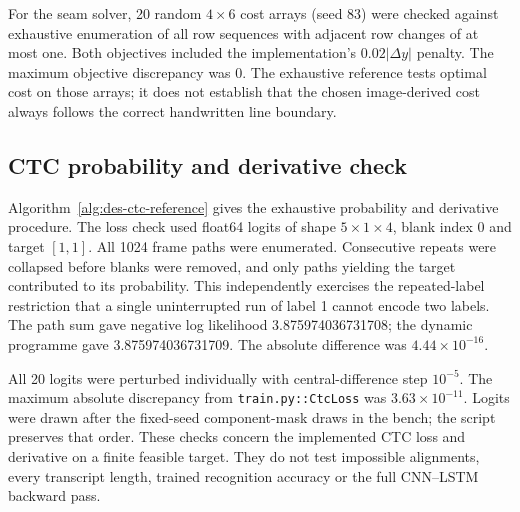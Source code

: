 For the seam solver, 20 random $4\times6$ cost arrays (seed 83) were checked against exhaustive enumeration of all row sequences with adjacent row changes of at most one. Both objectives included the implementation's $0.02|\Delta y|$ penalty. The maximum objective discrepancy was $0$. The exhaustive reference tests optimal cost on those arrays; it does not establish that the chosen image-derived cost always follows the correct handwritten line boundary.

\begin{designalgorithm}
\caption{Independent partition and seam verification}
\label{alg:des-reference-checks}
\begin{designpseudo}
\end{designpseudo}
\end{designalgorithm}

\subsection{CTC probability and derivative check}
Algorithm~\ref{alg:des-ctc-reference} gives the exhaustive probability and derivative procedure.
The loss check used float64 logits of shape $5\times1\times4$, blank index 0 and target $[1,1]$. All 1024 frame paths were enumerated. Consecutive repeats were collapsed before blanks were removed, and only paths yielding the target contributed to its probability. This independently exercises the repeated-label restriction that a single uninterrupted run of label 1 cannot encode two labels. The path sum gave negative log likelihood 3.875974036731708; the dynamic programme gave 3.875974036731709. The absolute difference was $4.44\times10^{-16}$.

All 20 logits were perturbed individually with central-difference step $10^{-5}$. The maximum absolute discrepancy from \texttt{train.py::CtcLoss} was $3.63\times10^{-11}$. Logits were drawn after the fixed-seed component-mask draws in the bench; the script preserves that order. These checks concern the implemented CTC loss and derivative on a finite feasible target. They do not test impossible alignments, every transcript length, trained recognition accuracy or the full CNN--LSTM backward pass.

